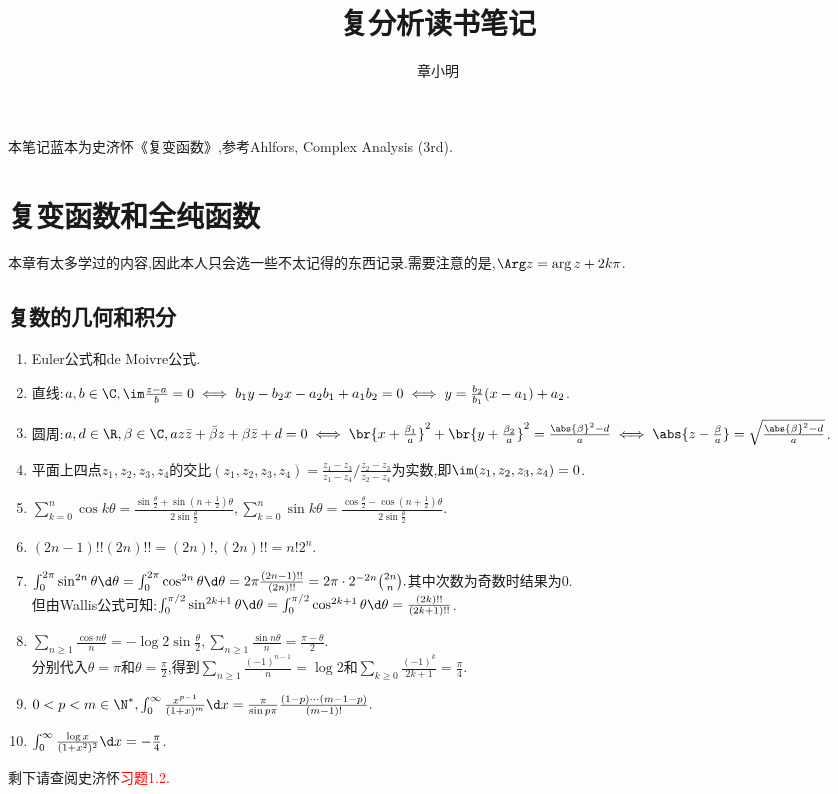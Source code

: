 \documentclass{article}
\title{复分析读书笔记}
\author{章小明}
\newcommand{\exerfunc}[1]{剩下请查阅史济怀\textcolor{red}{习题#1}.}
\begin{document}
\maketitle
\tableofcontents

本笔记蓝本为史济怀《复变函数》,参考Ahlfors, Complex Analysis (3rd).

\section{复变函数和全纯函数}
本章有太多学过的内容,因此本人只会选一些不太记得的东西记录.需要注意的是,$\Arg z=\arg z+2k\pi$.

\subsection{复数的几何和积分}
\begin{enumerate}
    \item Euler公式和de Moivre公式.
    \item 直线:$a,b\in \C, \im \frac{z-a}{b}=0\iff b_1y-b_2x-a_2b_1+a_1b_2=0\iff y=\frac{b_2}{b_1}(x-a_1)+a_2$.
    \item 圆周:$a,d\in \R,\beta\in \C, az\bar{z}+\bar{\beta} z+\beta\bar{z}+d=0\iff \br{x+\frac{\beta_1}{a}}^2+\br{y+\frac{\beta_2}{a}}^2=\frac{\abs{\beta}^2-d}{a}\iff \abs{z-\frac{\beta}{a}}=\sqrt{\frac{\abs{\beta}^2-d}{a}}$.
    \item 平面上四点$z_1,z_2,z_3,z_4$的交比$(z_1,z_2,z_3,z_4)=\frac{z_1-z_3}{z_1-z_4}\bigg/\frac{z_2-z_3}{z_2-z_4}$为实数,即$\im (z_1,z_2,z_3,z_4)=0$.
    \item $\sum_{k=0}^n\cos k\theta=\frac{\sin\frac{\theta}{2}+\sin(n+\frac{1}{2})\theta}{2\sin\frac{\theta}{2}},\sum_{k=0}^n\sin k\theta=\frac{\cos\frac{\theta}{2}-\cos(n+\frac{1}{2})\theta}{2\sin\frac{\theta}{2}}$.
    \item $(2n-1)!!(2n)!!=(2n)!, (2n)!!=n!2^n.$
    \item $\int_0^{2\pi}\sin^{2n}\theta\d\theta=\int_0^{2\pi}\cos^{2n}\theta\d\theta=2\pi\frac{(2n-1)!!}{(2n)!!}=2\pi\cdot 2^{-2n}\binom{2n}{n}.$其中次数为奇数时结果为0.\\
    但由Wallis公式可知:$\int_0^{\pi/2}\sin^{2k+1}\theta\d\theta=\int_0^{\pi/2}\cos^{2k+1}\theta\d\theta=\frac{(2k)!!}{(2k+1)!!}$.
    \item $\sum_{n\geq 1}\frac{\cos n\theta}{n}=-\log 2\sin\frac{\theta}{2}, \sum_{n\geq 1}\frac{\sin n\theta}{n}=\frac{\pi-\theta}{2}$.\\
    分别代入$\theta=\pi$和$\theta=\frac{\pi}{2}$,得到$\sum_{n\geq 1}\frac{(-1)^{n-1}}{n}=\log 2$和$\sum_{k\geq 0}\frac{(-1)^k}{2k+1}=\frac{\pi}{4}.$
    \item $0<p<m\in\N^*,\int_0^\infty\frac{x^{p-1}}{(1+x)^m}\d x=\frac{\pi}{\sin p\pi}\frac{(1-p)\cdots(m-1-p)}{(m-1)!}.$
    \item $\int_0^\infty\frac{\log x}{(1+x^2)^2}\d x=-\frac{\pi}{4}$.
\end{enumerate}
\exerfunc{1.2}
\end{document}
